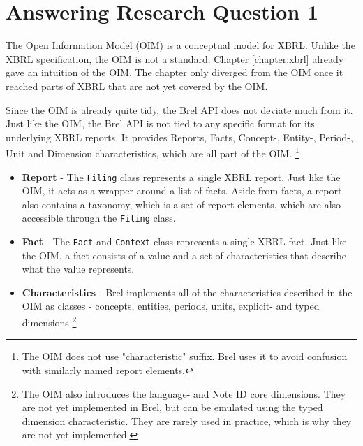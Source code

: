 \section{Answering Research Question 1}
\label{sec:answer_research_question_1}

The Open Information Model (OIM) is a conceptual model for XBRL.\cite{oim}
Unlike the XBRL specification, the OIM is not a standard.
Chapter \ref{chapter:xbrl} already gave an intuition of the OIM.
The chapter only diverged from the OIM once it reached parts of XBRL that are not yet covered by the OIM.

Since the OIM is already quite tidy, the Brel API does not deviate much from it.
Just like the OIM, the Brel API is not tied to any specific format for its underlying XBRL reports.
It provides Reports, Facts, Concept-, Entity-, Period-, Unit and Dimension characteristics, which are all part of the OIM.
\footnote{The OIM does not use "characteristic" suffix. Brel uses it to avoid confusion with similarly named report elements.}

\begin{itemize}
    \item \textbf{Report} - The \texttt{Filing} class represents a single XBRL report. 
    Just like the OIM, it acts as a wrapper around a list of facts.
    Aside from facts, a report also contains a taxonomy, which is a set of report elements, which are also accessible through the \texttt{Filing} class.
    \item \textbf{Fact} - The \texttt{Fact} and \texttt{Context} class represents a single XBRL fact.
    Just like the OIM, a fact consists of a value and a set of characteristics that describe what the value represents.
    \item \textbf{Characteristics} - Brel implements all of the characteristics described in the OIM as classes - 
    concepts, entities, periods, units, explicit- and typed dimensions
    \footnote{The OIM also introduces the language- and Note ID core dimensions. They are not yet implemented in Brel, but can be emulated using the typed dimension characteristic. They are rarely used in practice, which is why they are not yet implemented.}
\end{itemize}

